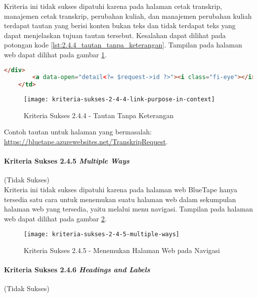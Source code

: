 Kriteria ini tidak sukses dipatuhi karena pada halaman cetak transkrip, manajemen cetak transkrip, perubahan kuliah, dan manajemen perubahan kuliah terdapat tautan yang berisi konten bukan teks dan tidak terdapat teks yang dapat menjelaskan tujuan tautan tersebut. Kesalahan dapat dilihat pada potongan kode \ref{lst:2.4.4_tautan_tanpa_keterangan}. Tampilan pada halaman web dapat dilihat pada gambar \ref{fig:2.4.4_link_purpose_in_context}.

\begin{lstlisting}[frame=single, label={lst:2.4.4_tautan_tanpa_keterangan}, language=HTML, caption=Kriteria Sukses 2.4.4 - Tautan Tanpa Keterangan]
        </div>
        <a data-open="detail<?= $request->id ?>"><i class="fi-eye"></i></a>
    </td>
\end{lstlisting}

\begin{figure}[H]
	\centering  
	\texttt{[image: kriteria-sukses-2-4-4-link-purpose-in-context]}  
    \caption[Kriteria Sukses 2.4.4 - Tautan Tanpa Keterangan]{Kriteria Sukses 2.4.4 - Tautan Tanpa Keterangan}
    \label{fig:2.4.4_link_purpose_in_context}  
\end{figure} 
Contoh tautan untuk halaman yang bermasalah: \url{https://bluetape.azurewebsites.net/TranskripRequest}.

\paragraph{Kriteria Sukses 2.4.5 \textit{Multiple Ways}}
\label{par:kepatuhan_bluetape_kriteria_sukses_2.4.5}
(Tidak Sukses)\\

Kriteria ini tidak sukses dipatuhi karena pada halaman web BlueTape hanya tersedia satu cara untuk menemukan suatu halaman web dalam sekumpulan halaman web yang tersedia, yaitu melalui menu navigasi. Tampilan pada halaman web dapat dilihat pada gambar \ref{fig:2.4.5_multiple_ways}.

\begin{figure}[H]
	\centering  
	\texttt{[image: kriteria-sukses-2-4-5-multiple-ways]}  
    \caption[Kriteria Sukses 2.4.5 - Menemukan Halaman Web pada Navigasi]{Kriteria Sukses 2.4.5 - Menemukan Halaman Web pada Navigasi}
    \label{fig:2.4.5_multiple_ways}  
\end{figure}

\paragraph{Kriteria Sukses 2.4.6 \textit{Headings and Labels}}
\label{par:kepatuhan_bluetape_kriteria_sukses_2.4.6}
(Tidak Sukses)\\

